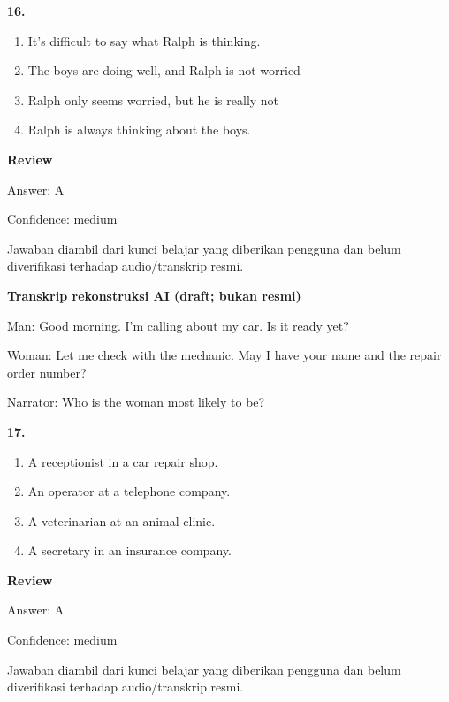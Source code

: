 \documentclass[12pt]{article}
\begin{document}
\noindent\textbf{16.}
\begin{enumerate}[label=(\Alph*),leftmargin=*,itemsep=0.2em]
\item It's difficult to say what Ralph is thinking.
\item The boys are doing well, and Ralph is not worried
\item Ralph only seems worried, but he is really not
\item Ralph is always thinking about the boys.
\end{enumerate}
\par
\begingroup
\setlength{\parskip}{0pt}
\setlength{\parindent}{0pt}
\textbf{Review}\par
Answer: A\par
Confidence: medium\par
Jawaban diambil dari kunci belajar yang diberikan pengguna dan belum diverifikasi terhadap audio/transkrip resmi.\par
\endgroup
\par
\vspace{0.25\baselineskip}
\begin{exampleblock}
\textbf{Transkrip rekonstruksi AI (draft; bukan resmi)}\par
Man: Good morning. I'm calling about my car. Is it ready yet?\par
Woman: Let me check with the mechanic. May I have your name and the repair order number?\par
Narrator: Who is the woman most likely to be?\par
\end{exampleblock}
\noindent\textbf{17.}
\begin{enumerate}[label=(\Alph*),leftmargin=*,itemsep=0.2em]
\item A receptionist in a car repair shop.
\item An operator at a telephone company.
\item A veterinarian at an animal clinic.
\item A secretary in an insurance company.
\end{enumerate}
\par
\begingroup
\setlength{\parskip}{0pt}
\setlength{\parindent}{0pt}
\textbf{Review}\par
Answer: A\par
Confidence: medium\par
Jawaban diambil dari kunci belajar yang diberikan pengguna dan belum diverifikasi terhadap audio/transkrip resmi.\par
\end{document}
